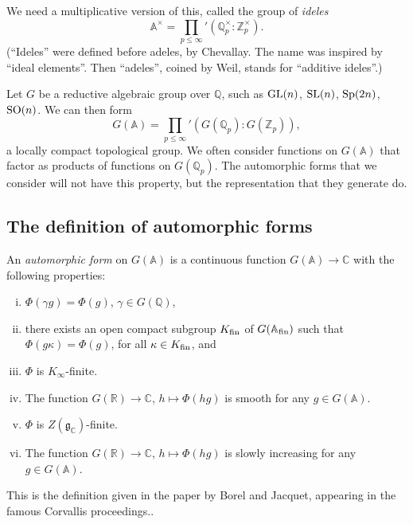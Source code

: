 \documentclass[reqno]{amsart} 
\begin{document}
We need a multiplicative version of this, called the group of \emph{ideles}
\begin{equation*}
  \mathbb{A}^\times = \prod_{p \leq \infty}'
  \left( \mathbb{Q}_p^\times : \mathbb{Z}_p^\times \right).
\end{equation*}
(``Ideles'' were defined before adeles, by Chevallay.  The name was inspired by ``ideal elements''.  Then ``adeles'', coined by Weil, stands for ``additive ideles''.)

Let $G$ be a reductive algebraic group over $\mathbb{Q}$, such as $\operatorname{GL}(n)$, $\operatorname{SL}(n)$, $\operatorname{Sp}(2 n)$, $\operatorname{SO}(n)$.  We can then form
\begin{equation*}
  G(\mathbb{A}) = \prod_{p \leq \infty} ' \left( G(\mathbb{Q}_p) : G(\mathbb{Z}_p) \right),
\end{equation*}
a locally compact topological group.  We often consider functions on $G(\mathbb{A})$ that factor as products of functions on $G(\mathbb{Q}_p)$.  The automorphic forms that we consider will not have this property, but the representation that they generate do.

\subsection{The definition of automorphic forms}

An \emph{automorphic form} on $G(\mathbb{A})$ is a continuous function $G(\mathbb{A}) \rightarrow \mathbb{C}$ with the following properties:
\begin{enumerate}[(i)]
\item\label{enumerate:cnog0r4l91} $\Phi(\gamma g) = \Phi(g)$, $\gamma \in G(\mathbb{Q})$,
\item\label{enumerate:cnog0r4na8} there exists an open compact subgroup $K_{\operatorname{fin}}$ of $G(\mathbb{A}_{\operatorname{fin}})$ such that $\Phi(g \kappa) = \Phi(g)$, for all $\kappa \in K_{\operatorname{fin}}$, and
\item\label{enumerate:cnog0r4okn} $\Phi$ is $K_\infty$-finite.
\item\label{enumerate:cnog0r4t0r} The function $G(\mathbb{R}) \rightarrow \mathbb{C}$, $h \mapsto \Phi(h g)$ is smooth for any $g \in G(\mathbb{A})$.
\item\label{enumerate:cnog0r4wjg} $\Phi$ is $Z(\mathfrak{g}_{\mathbb{C}})$-finite.
\item\label{enumerate:cnog0r4zp0} The function $G(\mathbb{R}) \rightarrow \mathbb{C}$, $h \mapsto \Phi(h g)$ is slowly increasing for any $g \in G(\mathbb{A})$.
\end{enumerate}
This is the definition given in the paper by Borel and Jacquet, appearing in the famous Corvallis proceedings..
\end{document}
